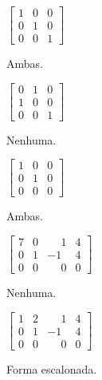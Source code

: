 \documentclass[12pt]{exam}
\begin{document}
\begin{multicols}{2}
    \begin{exercicio}\label{inicioverificamatrizes}
        $\begin{bmatrix}1 & 0 & 0\\0 & 1 & 0\\0 & 0 & 1\end{bmatrix}$
        \begin{solucao}
            Ambas.
        \end{solucao}
    \end{exercicio}

        \begin{exercicio}
        $\begin{bmatrix}0 & 1 & 0\\1 & 0 & 0\\0 & 0 & 1\end{bmatrix}$
        \begin{solucao}
            Nenhuma.
        \end{solucao}
    \end{exercicio}

    \begin{exercicio}
        $\begin{bmatrix}1 & 0 & 0\\0 & 1 & 0\\0 & 0 & 0\end{bmatrix}$
        \begin{solucao}
            Ambas.
        \end{solucao}
    \end{exercicio}

    \begin{exercicio}
        $\begin{bmatrix}7 & 0 & \phantom{-} 1 & 4\\0 & 1 & -1 & 4\\0 & 0 & \phantom{-} 0 & 0\end{bmatrix}$
        \begin{solucao}
            Nenhuma.
        \end{solucao}
    \end{exercicio}

        \begin{exercicio}
        $\begin{bmatrix}1 & 2 & \phantom{-} 1 & 4\\0 & 1 & -1 & 4\\0 & 0 & \phantom{-} 0 & 0\end{bmatrix}$
        \begin{solucao}
            Forma escalonada.
        \end{solucao}
    \end{exercicio}


\end{multicols}
\end{document}
